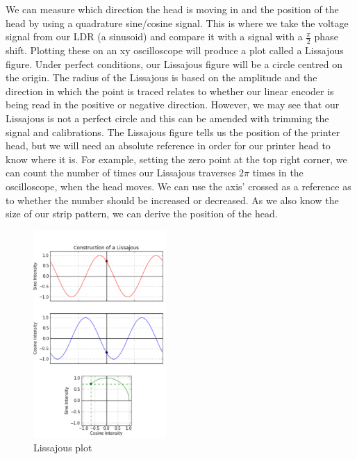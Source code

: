 \documentclass[conference]{IEEEtran}
\begin{document}
We can measure which direction the head is moving in and the position of the head by using a quadrature sine/cosine signal. This is where we take the voltage signal from our LDR (a sinusoid) and compare it with a signal with a $\frac{\pi}{2}$ phase shift. Plotting these on an xy oscilloscope will produce a plot called a Lissajous figure. Under perfect conditions, our Lissajous figure will be a circle centred on the origin. The radius of the Lissajous is based on the amplitude and the direction in which the point is traced relates to whether our linear encoder is being read in the positive or negative direction. However, we may see that our Lissajous is not a perfect circle and this can be amended with trimming the signal and calibrations. The Lissajous figure tells us the position of the printer head, but we will need an absolute reference in order for our printer head to know where it is. For example, setting the zero point at the top right corner, we can count the number of times our Lissajous traverses $2\pi$ times in the oscilloscope, when the head moves. We can use the axis' crossed as a reference as to whether the number should be increased or decreased. As we also know the size of our strip pattern, we can derive the position of the head.

\begin{figure}[htbp]
    \centerline{\includegraphics[width = 0.45\textwidth]{../img/Lissajous1.png}}
    \caption{Lissajous plot}
\end{figure}
\end{document}
